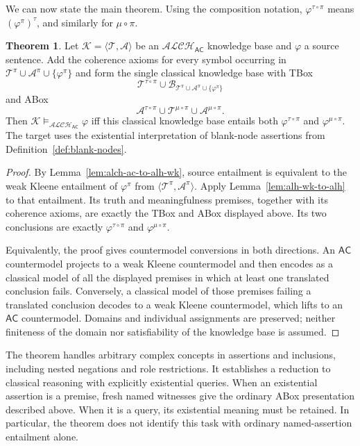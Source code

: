 \documentclass[letterpaper]{article} %
\theoremstyle{definition}
\theoremstyle{definition}
\theoremstyle{definition}
\newtheorem{theorem}{Theorem}
\theoremstyle{definition}
\theoremstyle{definition}
\begin{document}
We can now state the main theorem. Using the composition notation, $\varphi^{\tau\circ\pi}$ means $(\varphi^{\pi})^{\tau}$, and similarly for $\mu\circ\pi$.

\begin{theorem}\label{thm:faithful-ac}
Let $\mathcal{K}=\langle\mathcal{T},\mathcal{A}\rangle$ be an $\mathcal{ALCH}_{\mathsf{AC}}$ knowledge base and $\varphi$ a source sentence. Add the coherence axioms for every symbol occurring in $\mathcal{T}^{\pi}\cup\mathcal{A}^{\pi}\cup\{\varphi^{\pi}\}$ and form the single classical knowledge base with TBox
\[
\mathcal{T}^{\tau\circ\pi}\cup
\mathcal{B}_{\mathcal{T}^{\pi}\cup\mathcal{A}^{\pi}\cup\{\varphi^{\pi}\}}
\]
and ABox
\[
\mathcal{A}^{\tau\circ\pi}\cup
\mathcal{T}^{\mu\circ\pi}\cup\mathcal{A}^{\mu\circ\pi}.
\]
Then $\mathcal{K}\models_{\mathcal{ALCH}_{\mathsf{AC}}}\varphi$ iff this classical knowledge base entails both $\varphi^{\tau\circ\pi}$ and $\varphi^{\mu\circ\pi}$. The target uses the existential interpretation of blank-node assertions from Definition~\ref{def:blank-nodes}.
\end{theorem}

\begin{proof}
By Lemma~\ref{lem:alch-ac-to-alh-wk}, source entailment is equivalent to the weak Kleene entailment of $\varphi^{\pi}$ from $\langle\mathcal{T}^{\pi},\mathcal{A}^{\pi}\rangle$. Apply Lemma~\ref{lem:alh-wk-to-alh} to that entailment. Its truth and meaningfulness premises, together with its coherence axioms, are exactly the TBox and ABox displayed above. Its two conclusions are exactly $\varphi^{\tau\circ\pi}$ and $\varphi^{\mu\circ\pi}$.

Equivalently, the proof gives countermodel conversions in both directions. An $\mathsf{AC}$ countermodel projects to a weak Kleene countermodel and then encodes as a classical model of all the displayed premises in which at least one translated conclusion fails. Conversely, a classical model of those premises failing a translated conclusion decodes to a weak Kleene countermodel, which lifts to an $\mathsf{AC}$ countermodel. Domains and individual assignments are preserved; neither finiteness of the domain nor satisfiability of the knowledge base is assumed.
\end{proof}

The theorem handles arbitrary complex concepts in assertions and inclusions, including nested negations and role restrictions. It establishes a reduction to classical reasoning with explicitly existential queries. When an existential assertion is a premise, fresh named witnesses give the ordinary ABox presentation described above. When it is a query, its existential meaning must be retained. In particular, the theorem does not identify this task with ordinary named-assertion entailment alone.
\end{document}
